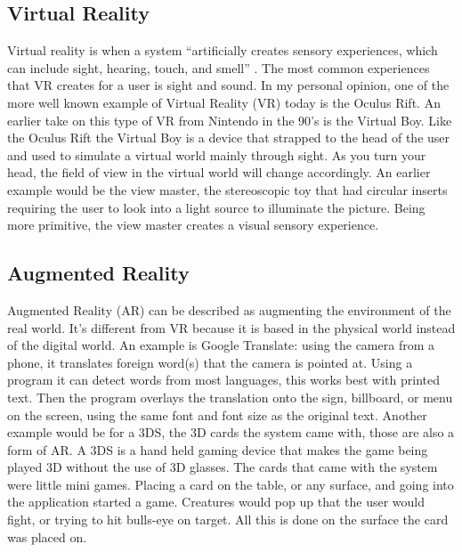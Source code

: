 \documentclass{sig-alternate}
\begin{document}
\subsection{Virtual Reality}
\label{sec:Virtual Reality}
Virtual reality is when a system ``artificially creates sensory experiences, which can include sight, hearing, touch, and smell'' \cite{VR}. The most common experiences that VR creates for a user is sight and sound. In my personal opinion, one of the more well known example of Virtual Reality (VR) today is the Oculus Rift. An earlier take on this type of VR from Nintendo in the 90's is the Virtual Boy. Like the Oculus Rift the Virtual Boy is a device that strapped to the head of the user and used to simulate a virtual world mainly through sight. As you turn your head, the field of view in the virtual world will change accordingly. An earlier example would be the view master, the stereoscopic toy that had circular inserts requiring the user to look into a light source to illuminate the picture. Being more primitive, the view master creates a visual sensory experience.       

\subsection{Augmented Reality}
\label{sec:Augmented Reality}
Augmented Reality (AR) can be described as augmenting the environment of the real world. It's different from VR because it is based in the physical world instead of the digital world. An example is Google Translate: using the camera from a phone, it translates foreign word(s) that the camera is pointed at. Using a program it can detect words from most languages, this works best with printed text. Then the program overlays the translation onto the sign, billboard, or menu on the screen, using the same font and font size as the original text. Another example would be for a 3DS, the 3D cards the system came with, those are also a form of AR. A 3DS is a hand held gaming device that makes the game being played 3D without the use of 3D glasses. The cards that came with the system were little mini games. Placing a card on the table, or any surface, and going into the application started a game. Creatures would pop up that the user would fight, or trying to hit bulls-eye on target. All this is done on the surface the card was placed on.   
\end{document}
